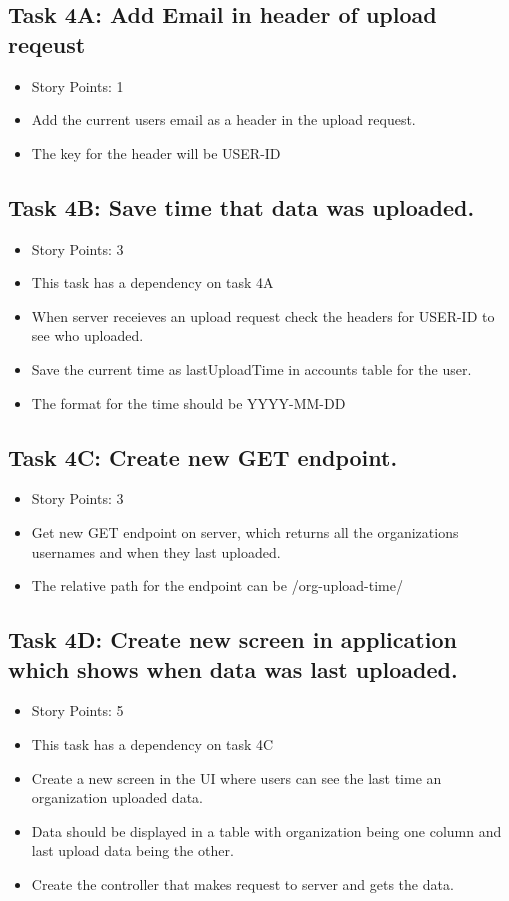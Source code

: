 \documentclass[12pt]{article}
\begin{document}
\subsection{Task 4A: Add Email in header of upload reqeust}
\begin{itemize}%
\item Story Points: 1
\item Add the current users email as a header in the upload request.
\item The key for the header will be USER-ID
\end{itemize}

\subsection{Task 4B: Save time that data was uploaded.}
\begin{itemize}%
\item Story Points: 3
\item This task has a dependency on task 4A
\item When server receieves an upload request check the headers for USER-ID to see who uploaded.
\item Save the current time as lastUploadTime in accounts table for the user.
\item The format for the time should be YYYY-MM-DD
\end{itemize}

\subsection{Task 4C: Create new GET endpoint.}
\begin{itemize}%
\item Story Points: 3
\item Get new GET endpoint on server, which returns all the organizations usernames and when they last uploaded.
\item The relative path for the endpoint can be /org-upload-time/
\end{itemize}

\subsection{Task 4D: Create new screen in application which shows when data was last uploaded.}
\begin{itemize}%
\item Story Points: 5
\item This task has a dependency on task 4C
\item Create a new screen in the UI where users can see the last time an organization uploaded data.
\item Data should be displayed in a table with organization being one column and last upload data being the other.
\item Create the controller that makes request to server and gets the data.
\end{itemize}
\end{document}
